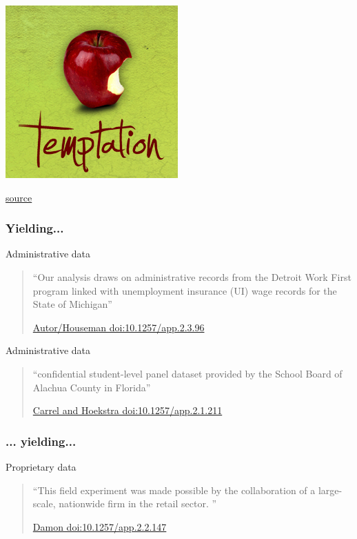 \begin{frame}
\centering
	\includegraphics{temptation.jpg}%

	\tiny \href{http://www.bridgesofgraceucc.org/}{source} %
\end{frame}


\begin{frame}
\frametitle{Yielding...}
\begin{block}{Administrative data}
\begin{quote}
 ``Our analysis draws on administrative records from the Detroit Work First program
linked with unemployment insurance (UI) wage records for the State of
Michigan'' 

\tiny \href{http://doi.org/10.1257/app.2.3.96}{Autor/Houseman doi:10.1257/app.2.3.96}
\end{quote}
\end{block}
\pause
\begin{block}{Administrative data}
\begin{quote}
	``confidential student-level panel
dataset provided by the School Board of Alachua County in Florida'' 

\tiny \href{http://doi.org/10.1257/app.2.1.211}{Carrel and Hoekstra doi:10.1257/app.2.1.211}

\end{quote}\end{block}
\end{frame}


\begin{frame}
\frametitle{... yielding...}
\begin{block}{Proprietary data}
\begin{quote}
	``This field experiment was made possible by the collaboration of a large-scale,
	nationwide firm in the retail sector. ''
	
	\tiny \href{http://doi.org/10.1257/app.2.2.147}{Damon doi:10.1257/app.2.2.147}
\end{quote}
\end{block}
\end{frame}



